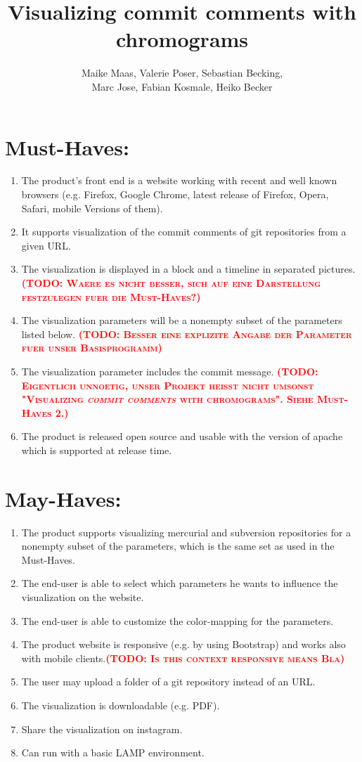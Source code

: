 \documentclass[10pt,a4paper]{article}
\author{Maike Maas, Valerie Poser, Sebastian Becking,\\
Marc Jose, Fabian Kosmale, Heiko Becker}
\title{Visualizing commit comments with chromograms}
\newcommand{\todo}[1]{\textbf{\textsc{\textcolor{red}{(TODO: #1)}}}}
\begin{document}
\maketitle
\section{Must-Haves:}
\begin{enumerate}
\item The product's front end is a website working with recent and well known browsers (e.g. Firefox, Google Chrome, latest release of Firefox, Opera, Safari, mobile Versions of them).
\item It supports visualization of the commit comments of git repositories from a given URL.
\item The visualization is displayed in a block and a timeline in separated pictures.
\todo{Waere es nicht besser, sich auf eine Darstellung festzulegen fuer die Must-Haves?}
\item The visualization parameters will be a nonempty subset of the parameters listed below. \todo{Besser eine explizite Angabe der Parameter fuer unser Basisprogramm}
\item The visualization parameter includes the commit message.
\todo{Eigentlich unnoetig, unser Projekt heißt nicht umsonst "Visualizing \textit{commit comments} with chromograms". Siehe Must-Haves 2.}
\item The product is released open source and usable with the version of apache which is supported at release time.
\end{enumerate}
\section{May-Haves:}
\begin{enumerate}
\item The product supports visualizing mercurial and subversion repositories for a nonempty subset of the parameters, which is the same set as used in the Must-Haves.
\item The end-user is able to select which parameters he wants to influence the visualization on the website.
\item The end-user is able to customize the color-mapping for the parameters.
\item The product website is responsive (e.g. by using Bootstrap) and works also with mobile clients.\todo{ Is this context responsive means Bla}
\item The user may upload a folder of a git repository instead of an URL.
\item The visualization is downloadable (e.g. PDF).
\item Share the visualization on instagram.
\item Can run with a basic LAMP environment.
\end{enumerate}
\end{document}

